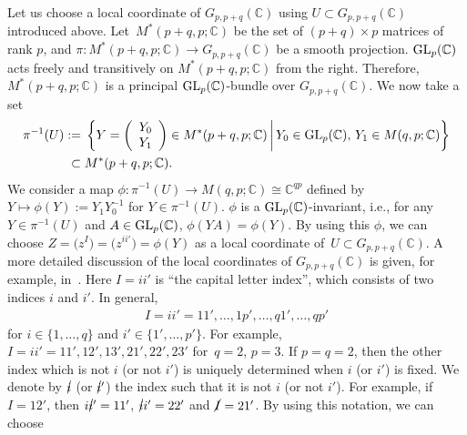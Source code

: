 \documentclass[pdftex]{sigma}
\numberwithin{equation}{section}
\begin{document}
Let us choose a local coordinate of $G_{p,p+q}(\mathbb{C})$ using
$
U
\subset
G_{p,p+q}(\mathbb{C})
$
introduced above. Let~${M^{\ast}(p+q,p;\mathbb{C})}$ be the set of
$
(p+q)
\times
p
$
matrices of rank $p$, and
$
\pi\colon
M^{\ast}(p+q,p;\mathbb{C})
\to
G_{p,p+q}(\mathbb{C})
$
be a smooth projection. ${\rm GL}_{p}(\mathbb{C})$ acts freely and transitively on $M^{\ast}(p+q,p;\mathbb{C})$ from the right. Therefore, $M^{\ast}(p+q,p;\mathbb{C})$ is a principal ${\rm GL}_{p}(\mathbb{C})$-bundle over $G_{p,p+q}(\mathbb{C})$. We now take a set
\begin{align*}%
 \pi^{-1}(U)
:={} &
 \left\{
 Y
 =
 \left(
 \begin{array}{c}
 Y_{0}\\
 Y_{1}
 \end{array}
 \right)
 \in
 M^{\ast}(p+q,p;\mathbb{C})
 \,\bigg|\,
 Y_{0}
 \in
 {\rm GL}_{p}
 (
 \mathbb{C}
 ),\,
 Y_{1}
 \in
 M
 (
 q,p
 ;
 \mathbb{C}
 )
 \right\}\\
 \subset{}&
 M^{\ast}(p+q,p;\mathbb{C})
 .
\end{align*}
We consider a map
$
 \phi
\colon
 \pi^{-1}(U)
 \to
 M(q,p;\mathbb{C})
 \cong\mathbb{C}^{qp}
$
defined by
$
 Y
 \mapsto
 \phi
 (Y)
 :=
 Y_{1}
 Y_{0}^{-1}
$
for
$
Y
\in
\pi^{-1}(U)
$.
$\phi$ is a ${\rm GL}_{p}(\mathbb{C})$-invariant, i.e., for any
$
Y
\in
\pi^{-1}(U)
$
and
$
A
\in
{\rm GL}_{p}(\mathbb{C})
$,
$\phi(YA)=\phi(Y)$. By using this $\phi$, we can choose
$
 Z
 =
 \bigl(
 z^{I}
 \bigr)
 =
 \bigl(
 z^{ii'}
 \bigr)
 =
 \phi
 (Y)
$
as a local coordinate of~$U
\subset
G_{p,p+q}(\mathbb{C})
$.
A more detailed discussion of the local coordinates of $G_{p,p+q}(\mathbb{C})$ is given, for example, in~\cite{KN}.
Here $I=ii'$ is ``the capital letter index'', which consists of two indices $i$ and $i'$. In general,
\begin{align*}
 I = ii' = 11', \dots, 1p', \dots, q1', \dots, qp'
 \end{align*}
for
$i\in \{1,\dots,q \}$
and
$i'\in \{1',\dots,p' \}$.
For example,
$
 I
 =
 ii'
 =
 11',
 12',
 13',
 21',
 22',
 23'
$
for~${
q=2}$,
$p=3
$.
If $p=q=2$, then the other index which is not $i$ (or not $i'$) is uniquely determined when $i$
(or $i'$) is fixed. We denote by $\cancel{i}$ (or $\cancel{i}'$) the index such that it is not $i$ (or not $i'$). For example, if $I=12'$, then
$
i\cancel{i}'=11'$,
$\cancel{i}i'=22'
$
and
$
\cancel{I}
=
21'
$.
By using this notation, we can choose~
\end{document}
